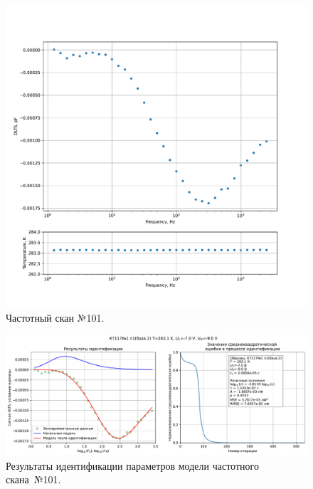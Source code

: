 \begin{figure}[!ht]
    \centering
    \includegraphics[width=1\textwidth]{../plots/КТ117№1_п1(база 2)_2500Гц-1Гц_1пФ_+10С_-7В-9В_50мВ_20мкс_шаг_0,1.pdf}
    \caption{Частотный скан №101.}
    \label{pic:frequency_scan_101}
\end{figure}

\begin{figure}[!ht]
    \centering
    \includegraphics[width=1\textwidth]{../plots/КТ117№1_п1(база 2)_2500Гц-1Гц_1пФ_+10С_-7В-9В_50мВ_20мкс_шаг_0,1_model.pdf}
    \caption{Результаты идентификации параметров модели частотного скана~№101.}
    \label{pic:frequency_scan_model101}
\end{figure}

\pagebreak


